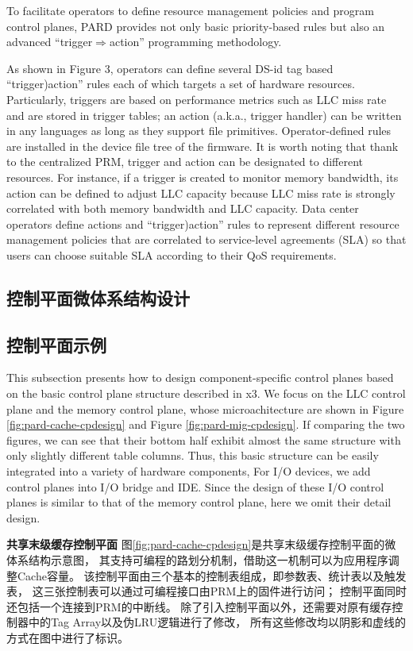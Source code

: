 To facilitate
operators to define resource management policies and program
control planes, PARD provides not only basic priority-based rules
but also an advanced ``trigger$\Rightarrow$action'' programming methodology.

As shown in Figure 3, operators can define several DS-id tag
based “trigger)action” rules each of which targets a set of hardware
resources. Particularly, triggers are based on performance
metrics such as LLC miss rate and are stored in trigger tables; an
action (a.k.a., trigger handler) can be written in any languages as
long as they support file primitives. Operator-defined rules are installed
in the device file tree of the firmware. It is worth noting that
thank to the centralized PRM, trigger and action can be designated
to different resources. For instance, if a trigger is created to monitor
memory bandwidth, its action can be defined to adjust LLC capacity
because LLC miss rate is strongly correlated with both memory
bandwidth and LLC capacity.
Data center operators define actions and “trigger)action” rules
to represent different resource management policies that are correlated
to service-level agreements (SLA) so that users can choose
suitable SLA according to their QoS requirements.


\subsection{控制平面微体系结构设计}


\subsection{控制平面示例}

This subsection presents how to design component-specific control
planes based on the basic control plane structure described in
x3. We focus on the LLC control plane and the memory control
plane, whose microachitecture are shown in Figure \ref{fig:pard-cache-cpdesign}
and Figure \ref{fig:pard-mig-cpdesign}.
If comparing the two figures, we can see that their bottom half
exhibit almost the same structure with only slightly different table
columns. Thus, this basic structure can be easily integrated into a
variety of hardware components,
For I/O devices, we add control planes into I/O bridge and IDE.
Since the design of these I/O control planes is similar to that of the
memory control plane, here we omit their detail design.

\textbf{共享末级缓存控制平面}\quad
图\ref{fig:pard-cache-cpdesign}是共享末级缓存控制平面的微体系结构示意图，
其支持可编程的路划分机制，借助这一机制可以为应用程序调整Cache容量。
该控制平面由三个基本的控制表组成，即参数表、统计表以及触发表，
这三张控制表可以通过可编程接口由PRM上的固件进行访问；
控制平面同时还包括一个连接到PRM的中断线。
除了引入控制平面以外，还需要对原有缓存控制器中的Tag Array以及伪LRU逻辑进行了修改，
所有这些修改均以阴影和虚线的方式在图中进行了标识。

